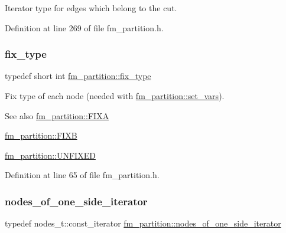 Iterator type for edges which belong to the cut. 

Definition at line 269 of file fm\+\_\+partition.\+h.

\mbox{\label{classfm__partition_a63693cd93d587dca3d1842f831cd1c55}} 
\subsubsection{\texorpdfstring{fix\+\_\+type}{fix\_type}}
{\footnotesize\ttfamily typedef short int \mbox{\hyperlink{classfm__partition_a63693cd93d587dca3d1842f831cd1c55}{fm\+\_\+partition\+::fix\+\_\+type}}}

Fix type of each node (needed with \mbox{\hyperlink{classfm__partition_aa15471da2b6a0f14060b0c4091c6b05c}{fm\+\_\+partition\+::set\+\_\+vars}}).

\begin{DoxySeeAlso}{See also}
\mbox{\hyperlink{classfm__partition_a468a80e072d3ff18e5da33005825bcb1}{fm\+\_\+partition\+::\+F\+I\+XA}} 

\mbox{\hyperlink{classfm__partition_a0b9a66f0e8093ee83482f93d6aa5b2eb}{fm\+\_\+partition\+::\+F\+I\+XB}} 

\mbox{\hyperlink{classfm__partition_a24447561db0ea633212c597c5e1fca56}{fm\+\_\+partition\+::\+U\+N\+F\+I\+X\+ED}} 
\end{DoxySeeAlso}


Definition at line 65 of file fm\+\_\+partition.\+h.

\mbox{\label{classfm__partition_ad6cca73d48cc73d7bee1f52bf1c9a9fe}} 
\subsubsection{\texorpdfstring{nodes\+\_\+of\+\_\+one\+\_\+side\+\_\+iterator}{nodes\_of\_one\_side\_iterator}}
{\footnotesize\ttfamily typedef nodes\+\_\+t\+::const\+\_\+iterator \mbox{\hyperlink{classfm__partition_ad6cca73d48cc73d7bee1f52bf1c9a9fe}{fm\+\_\+partition\+::nodes\+\_\+of\+\_\+one\+\_\+side\+\_\+iterator}}}

